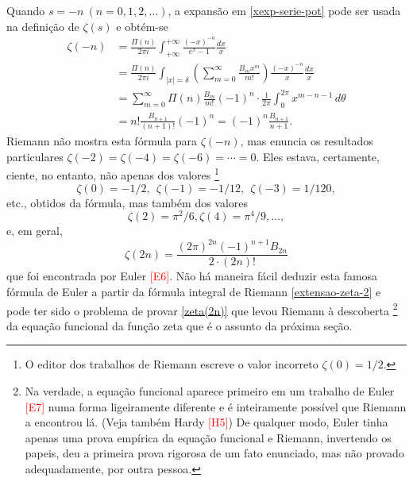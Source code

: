     Quando $s = -n \ (n = 0, 1, 2, \dots)$, a expansão em \eqref{xexp-serie-pot} pode ser usada na definição de $\zeta(s)$ e obtém-se
    \begin{align*}
        \zeta(-n) &= \frac{\Pi(n)}{2\pi i} \int_{+\infty}^{+\infty} \frac{(-x)^{-n}}{e^x - 1} \frac{dx}{x} \\
        &= \frac{\Pi(n)}{2\pi i} \int_{|x| = \delta} \left( \sum_{m=0}^{\infty} \frac{B_m x^m}{m!} \right) \frac{(-x)^{-n}}{x} \frac{dx}{x} \\
        &= \sum_{m=0}^{\infty} \Pi(n)\frac{B_m}{m!}(-1)^n \cdot \frac{1}{2\pi} \int_{0}^{2\pi}  x^{m - n - 1} \, d\theta \\
        &= n!\frac{B_{n+1}}{(n+1)!}(-1)^n = (-1)^n \frac{B_{n+1}}{n+1}.
    \end{align*}
    Riemann não mostra esta fórmula para $\zeta(-n)$, mas enuncia os resultados particulares $\zeta(-2) = \zeta(-4) = \zeta(-6) =  \cdots = 0$. Eles estava, certamente, ciente, no entanto, não apenas dos valores 
    \footnote{ 
    O editor dos trabalhos de Riemann escreve o valor incorreto $\zeta(0) = 1/2$.
    }
    \begin{equation*}
        \zeta(0) = -1/2, \ \ \zeta(-1) = -1/12, \ \ \zeta(-3) = 1/120, 
    \end{equation*}
    etc., obtidos da fórmula, mas também dos valores
    \begin{equation*}
        \zeta(2) = \pi^2/6, \zeta(4) = \pi^4/9, \dots, 
    \end{equation*}
    e, em geral, 
    \begin{equation}
        \label{zeta(2n)}
        \zeta(2n) = \frac{(2\pi)^{2n}(-1)^{n+1}B_{2n}}{2 \cdot (2n)!}
    \end{equation}
    que foi encontrada por Euler \textcolor{red}{[E6]}. Não há maneira fácil deduzir esta famosa fórmula de Euler a partir da fórmula integral de Riemann \eqref{extensao-zeta-2} e pode ter sido o problema de provar \eqref{zeta(2n)} que levou Riemann à descoberta
    \footnote{ Na verdade, a equação funcional aparece primeiro em um trabalho de Euler \textcolor{red}{[E7]} numa forma ligeiramente diferente e é inteiramente possível que Riemann a encontrou lá. (Veja também Hardy \textcolor{red}{[H5]}) De qualquer modo, Euler tinha apenas uma prova empírica da equação funcional e Riemann, invertendo os papeis, deu a primeira prova rigorosa de um fato enunciado, mas não provado adequadamente, por outra pessoa.
    }
    da equação funcional da função zeta que é o assunto da próxima seção.
    
